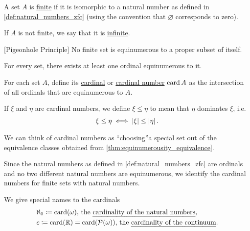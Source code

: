 \begin{definition}\label{def:finite_set}\cite[133]{Enderton1977}
  A set $A$ is \ul{finite} if it is isomorphic to a natural number as defined in \cref{def:natural_numbers_zfc} (using the convention that $\varnothing$ corresponds to zero).

  If $A$ is not finite, we say that it is \ul{infinite}.
\end{definition}

\begin{theorem}\label{def:pigeonhole_principle}[Pigeonhole Principle]\cite[Corollary 6C]{Enderton1977}
  No finite set is equinumerous to a proper subset of itself.
\end{theorem}

\begin{theorem}\label{thm:equinumerous_ordinal_existence}\cite[197]{Enderton1977}
  For every set, there exists at least one ordinal equinumerous to it.
\end{theorem}

\begin{definition}\label{def:cardinal}\cite[197]{Enderton1977}
  For each set $A$, define its \ul{cardinal} or \ul{cardinal number} $\operatorname{card} A$ as the intersection of all ordinals that are equinumerous to $A$.

  If $\xi$ and $\eta$ are cardinal numbers, we define $\xi \leq \eta$ to mean that $\eta$ dominates $\xi$, i.e.
  \begin{align*}
    \xi \leq \eta \iff \left\vert \xi \right\vert \leq \left\vert \eta \right\vert.
  \end{align*}
\end{definition}

\begin{note}\label{note:cardinals}
  We can think of cardinal numbers as \enquote{choosing}\AOC a special set out of the equivalence classes obtained from \cref{thm:equinumerousity_equivalence}.

  Since the natural numbers as defined in \cref{def:natural_numbers_zfc} are ordinals and no two different natural numbers are equinumerous, we identify the cardinal numbers for finite sets with natural numbers.

  We give special names to the cardinals
  \begin{align*}
    &\aleph_0 \coloneqq \Card(\omega) \text{, the \ul{cardinality of the natural numbers}}, \\
    &c \coloneqq \Card(\BB{R}) = \Card(\Power(\omega)) \text{, the \ul{cardinality of the continuum}}.
  \end{align*}
\end{note}

